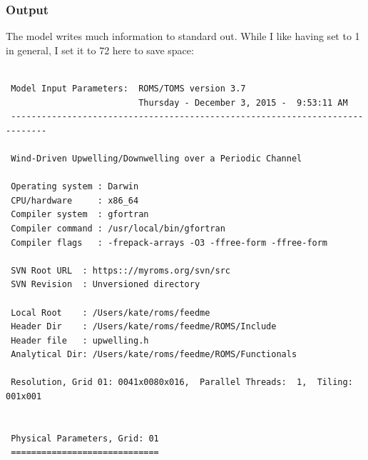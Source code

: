 \subsubsection{Output}
\label{Output}
The model writes much information to standard out. While I like
having  set to 1 in general, I set it to 72 here to save
space:
\begin{verbatim}

 Model Input Parameters:  ROMS/TOMS version 3.7  
                          Thursday - December 3, 2015 -  9:53:11 AM
 -----------------------------------------------------------------------------

 Wind-Driven Upwelling/Downwelling over a Periodic Channel

 Operating system : Darwin
 CPU/hardware     : x86_64
 Compiler system  : gfortran
 Compiler command : /usr/local/bin/gfortran
 Compiler flags   : -frepack-arrays -O3 -ffree-form -ffree-form

 SVN Root URL  : https:://myroms.org/svn/src
 SVN Revision  : Unversioned directory

 Local Root    : /Users/kate/roms/feedme
 Header Dir    : /Users/kate/roms/feedme/ROMS/Include
 Header file   : upwelling.h
 Analytical Dir: /Users/kate/roms/feedme/ROMS/Functionals

 Resolution, Grid 01: 0041x0080x016,  Parallel Threads:  1,  Tiling: 001x001


 Physical Parameters, Grid: 01
 =============================


\end{verbatim}
